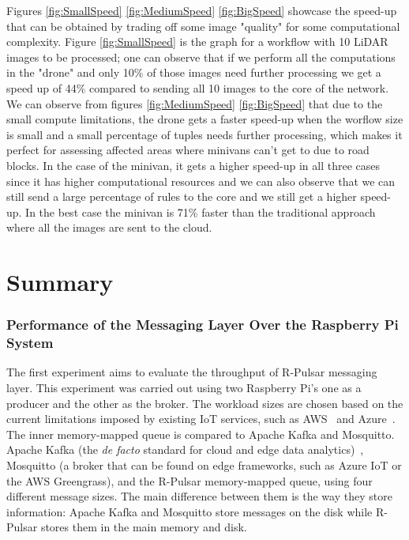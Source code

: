 Figures \ref{fig:SmallSpeed} \ref{fig:MediumSpeed} \ref{fig:BigSpeed} showcase the speed-up that can be obtained by trading off some image "quality" for some computational complexity. Figure \ref{fig:SmallSpeed} is the graph for a workflow with 10 LiDAR images to be processed; one can observe that if we perform all the computations in the "drone" and only 10\% of those images need further processing we get a speed up of 44\% compared to sending all 10 images to the core of the network. We can observe from figures \ref{fig:MediumSpeed} \ref{fig:BigSpeed} that due to the small compute limitations, the drone gets a faster speed-up when the worflow size is small and a small percentage of tuples needs further processing, which makes it perfect for assessing affected areas where minivans can't get to due to road blocks. In the case of the minivan, it gets a higher speed-up in all three cases since it has higher computational resources and we can also observe that we can still send a large percentage of rules to the core and we still get a higher speed-up. In the best case the minivan is 71\% faster than the traditional approach where all the images are sent to the cloud.

\section{Summary}




\subsubsection{Performance of the Messaging Layer Over the Raspberry Pi System}
\hfill\vspace{1ex}

The first experiment aims to evaluate the throughput of R-Pulsar messaging layer.
This experiment was carried out using two Raspberry Pi's one as a producer and the other as the broker. The workload sizes are chosen based on the current limitations imposed by existing IoT services, such as AWS~\cite{AWS-MQTT} and Azure~\cite{AZURE-MQTT}.
The inner memory-mapped queue is compared to Apache Kafka and Mosquitto.
Apache Kafka (the \textit{de facto} standard for cloud and edge data analytics)~\cite{Young2017, firework, planner}, Mosquitto (a broker that can be found on edge frameworks, such as Azure IoT or the AWS Greengrass), and the R-Pulsar memory-mapped queue, using four different message sizes.  The main difference between them is the way they store information: Apache Kafka and Mosquitto store messages on the disk while R-Pulsar stores them in the main memory and disk. 


